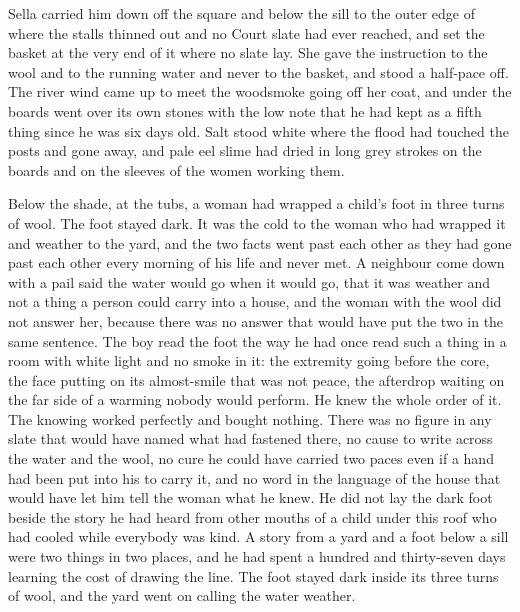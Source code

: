 \scenebreak

Sella carried him down off the square and below the sill to the outer edge of  where the stalls thinned out and no Court slate had ever reached, and set the basket at the very end of it where no slate lay. She gave the instruction to the wool and to the running water and never to the basket, and stood a half-pace off. The river wind came up to meet the woodsmoke going off her coat, and under the boards  went over its own stones with the low note that he had kept as a fifth thing since he was six days old. Salt stood white where the flood had touched the posts and gone away, and pale eel slime had dried in long grey strokes on the boards and on the sleeves of the women working them.

Below the shade, at the tubs, a woman had wrapped a child's foot in three turns of wool. The foot stayed dark. It was the cold to the woman who had wrapped it and weather to the yard, and the two facts went past each other as they had gone past each other every morning of his life and never met. A neighbour come down with a pail said the water would go when it would go, that it was weather and not a thing a person could carry into a house, and the woman with the wool did not answer her, because there was no answer that would have put the two in the same sentence. The boy read the foot the way he had once read such a thing in a room with white light and no smoke in it: the extremity going before the core, the face putting on its almost-smile that was not peace, the afterdrop waiting on the far side of a warming nobody would perform. He knew the whole order of it. The knowing worked perfectly and bought nothing. There was no figure in any slate that would have named what had fastened there, no cause to write across the water and the wool, no cure he could have carried two paces even if a hand had been put into his to carry it, and no word in the language of the house that would have let him tell the woman what he knew. He did not lay the dark foot beside the story he had heard from other mouths of a child under this roof who had cooled while everybody was kind. A story from a yard and a foot below a sill were two things in two places, and he had spent a hundred and thirty-seven days learning the cost of drawing the line. The foot stayed dark inside its three turns of wool, and the yard went on calling the water weather.

